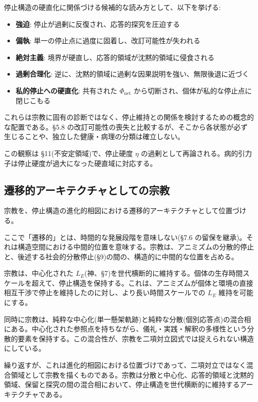 停止構造の硬直化に関係づける候補的な読み方として、以下を挙げる:

\begin{itemize}
\item \textbf{強迫}: 停止が過剰に反復され、応答的探究を圧迫する
\item \textbf{偏執}: 単一の停止点に過度に固着し、改訂可能性が失われる
\item \textbf{絶対主義}: 境界が硬直し、応答的領域が沈黙的領域に侵食される
\item \textbf{過剰合理化}: 逆に、沈黙的領域に過剰な因果説明を強い、無限後退に近づく
\item \textbf{私的停止への硬直化}: 共有された $\Phi_{\text{net}}$ から切断され、個体が私的な停止点に閉じこもる
\end{itemize}


これらは宗教に固有の診断ではなく、停止維持との関係を検討するための概念的な配置である。\S{}5.8 の改訂可能性の喪失と比較するが、そこから各状態が必ず生じることや、独立した健康・病理の分類は確立しない。

この観察は \S{}11(不安定領域)で、停止硬度 $\eta$ の過剰として再論される。病的引力子は停止硬度が過大になった硬直域に対応する。

\bigskip


\subsection{遷移的アーキテクチャとしての宗教}


宗教を、停止構造の進化的相図における遷移的アーキテクチャとして位置づける。

ここで「遷移的」とは、時間的な発展段階を意味しない(\S{}7.6 の留保を継承)。それは構造空間における中間的位置を意味する。宗教は、アニミズムの分散的停止と、後述する社会的分散停止(\S{}9)の間の、構造的に中間的な位置を占める。

宗教は、中心化された $L_E$(神、\S{}7)を世代横断的に維持する。個体の生存時間スケールを超えて、停止構造を保持する。これは、アニミズムが個体と環境の直接相互干渉で停止を維持したのに対し、より長い時間スケールでの $L_E$ 維持を可能にする。

同時に宗教は、純粋な中心化(単一懸架軌跡)と純粋な分散(個別応答点)の混合相にある。中心化された参照点を持ちながら、儀礼・実践・解釈の多様性という分散的要素を保持する。この混合性が、宗教を二項対立図式では捉えられない構造にしている。

繰り返すが、これは進化的相図における位置づけであって、二項対立ではなく混合領域として宗教を描くものである。宗教は分散と中心化、応答的領域と沈黙的領域、保留と探究の間の混合相において、停止構造を世代横断的に維持するアーキテクチャである。

